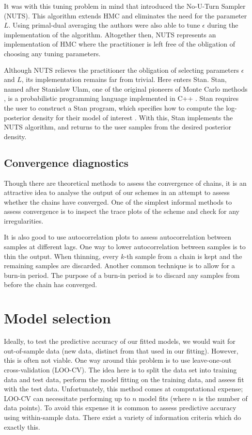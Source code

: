 It was with this tuning problem in mind that \textcite{hoffman14} introduced the No-U-Turn
Sampler (NUTS). This algorithm extends HMC and eliminates the need for the parameter $L$.
Using primal-dual averaging the authors were also able to tune $\epsilon$ during the
implementation of the algorithm. Altogether then, NUTS represents an implementation of HMC
where the practitioner is left free of the obligation of choosing any tuning parameters.

Although NUTS relieves the practitioner the obligation of selecting parameters $\epsilon$
and $L$, its implementation remains far from trivial. Here enters Stan. Stan, named after
Stanislaw Ulam, one of the original pioneers of Monte Carlo methods
\parencite{metropolis49}, is a probabilistic programming language implemented in C++
\parencite{gelman15}. Stan requires the user to construct a Stan program, which specifies
how to compute the log-posterior density for their model of interest
\parencite{stanteam15}. With this, Stan implements the NUTS algorithm, and returns to the
user samples from the desired posterior density.

\subsection{Convergence diagnostics}
\label{ssec:convergence_diagnostics}

Though there are theoretical methods to assess the convergence of chains, it is an
attractive idea to analyse the output of our schemes in an attempt to assess whether the
chains have converged. One of the simplest informal methods to assess convergence is to
inspect the trace plots of the scheme and check for any irregularities.

It is also good to use autocorrelation plots to assess autocorrelation between samples at
different lags.  One way to lower autocorrelation between samples is to thin the output.
When thinning, every $k$-th sample from a chain is kept and the remaining samples are
discarded. Another common technique is to allow for a burn-in period. The purpose of a
burn-in period is to discard any samples from before the chain has converged.

\section{Model selection}
\label{sec:model_comparison}

Ideally, to test the predictive accuracy of our fitted models, we would wait for
out-of-sample data (new data, distinct from that used in our fitting).  However, this is
often not viable. One way around this problem is to use leave-one-out cross-validation
(LOO-CV). The idea here is to split the data set into training data and test data, perform
the model fitting on the training data, and assess fit with the test data.  Unfortunately,
this method comes at computational expense; LOO-CV can necessitate performing up to $n$
model fits (where $n$ is the number of data points). To avoid this expense it is common to
assess predictive accuracy using within-sample data. There exist a variety of information
criteria which do exactly this.

